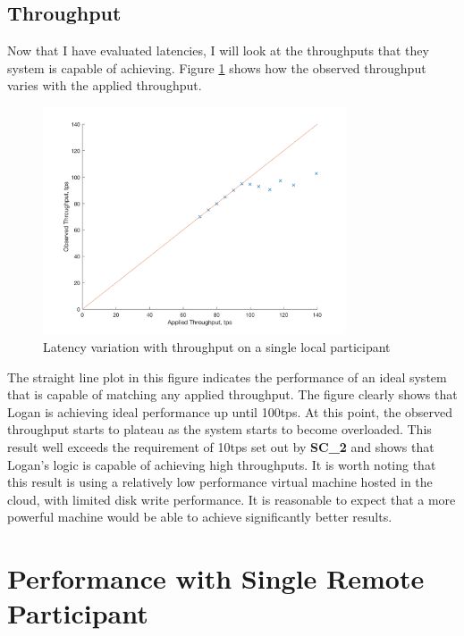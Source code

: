 \documentclass[12pt,a4paper,twoside,openright]{report}
\begin{document}
	\subsection{Throughput}
	Now that I have evaluated latencies, I will look at the throughputs that they system is capable of achieving.
	Figure \ref{fig:singlocal} shows how the observed throughput varies with the applied throughput.  
	\begin{figure}
		\centering
		\includegraphics[width=0.8\textwidth]{figs/appliedvsobservedlocal.png}
		\caption{Latency variation with throughput on a single local participant}
		\label{fig:singlocal}
	\end{figure}
	The straight line plot in this figure indicates the performance of an ideal system that is capable of matching any applied throughput.
	The figure clearly shows that Logan is achieving ideal performance up until 100tps.
	At this point, the observed throughput starts to plateau as the system starts to become overloaded. 
	This result well exceeds the requirement of 10tps set out by \textbf{SC\_2} and shows that Logan's logic is capable of achieving high throughputs.
	It is worth noting that this result is using a relatively low performance virtual machine hosted in the cloud, with limited disk write performance. 
	It is reasonable to expect that a more powerful machine would be able to achieve significantly better results.\\

	\section{Performance with Single Remote Participant}
\end{document}
